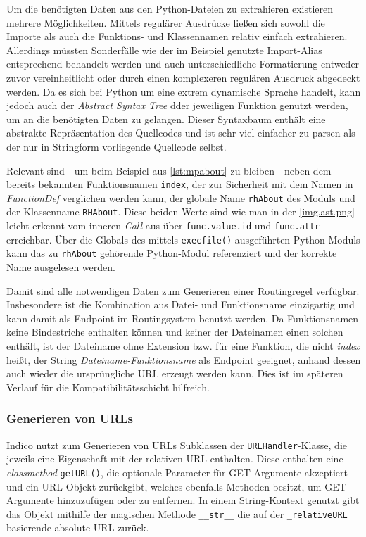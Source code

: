 Um die benötigten Daten aus den Python-Dateien zu extrahieren existieren mehrere Möglichkeiten.
Mittels regulärer Ausdrücke ließen sich sowohl die Importe als auch die Funktions- und Klassennamen
relativ einfach extrahieren. Allerdings müssten Sonderfälle wie der im Beispiel genutzte
Import-Alias entsprechend behandelt werden und auch unterschiedliche Formatierung entweder zuvor
vereinheitlicht oder durch einen komplexeren regulären Ausdruck abgedeckt werden. Da es sich bei
Python um eine extrem dynamische Sprache handelt, kann jedoch auch der \emph{Abstract Syntax Tree}
dder jeweiligen Funktion genutzt werden, um an die benötigten Daten zu gelangen. Dieser Syntaxbaum
enthält eine abstrakte Repräsentation des Quellcodes und ist sehr viel einfacher zu parsen als der
nur in Stringform vorliegende Quellcode selbst.


Relevant sind - um beim Beispiel aus \autoref{lst:mpabout} zu bleiben - neben dem bereits bekannten
Funktionsnamen \lstinline{index}, der zur Sicherheit mit dem Namen in \emph{FunctionDef} verglichen
werden kann, der globale Name \lstinline{rhAbout} des Moduls und der Klassenname
\lstinline{RHAbout}. Diese beiden Werte sind wie man in der \autoref{img.ast.png} leicht erkennt vom
inneren \emph{Call} aus über \lstinline{func.value.id} und \lstinline{func.attr} erreichbar. Über
die Globals des mittels \lstinline{execfile()} ausgeführten Python-Moduls kann das zu
\lstinline{rhAbout} gehörende Python-Modul referenziert und der korrekte Name ausgelesen werden.

Damit sind alle notwendigen Daten zum Generieren einer Routingregel verfügbar. Insbesondere ist die
Kombination aus Datei- und Funktionsname einzigartig und kann damit als Endpoint im Routingsystem
benutzt werden. Da Funktionsnamen keine Bindestriche enthalten können und keiner der Dateinamen
einen solchen enthält, ist der Dateiname ohne Extension bzw. für eine Funktion, die nicht
\emph{index} heißt, der String \emph{Dateiname-Funktionsname} als Endpoint geeignet, anhand dessen
auch wieder die ursprüngliche URL erzeugt werden kann. Dies ist im späteren Verlauf für die
Kompatibilitätsschicht hilfreich.


\subsubsection{Generieren von URLs}

Indico nutzt zum Generieren von URLs Subklassen der \lstinline{URLHandler}-Klasse, die jeweils eine
Eigenschaft mit der relativen URL enthalten. Diese enthalten eine \emph{classmethod}
\lstinline{getURL()}, die optionale Parameter für GET-Argumente akzeptiert und ein URL-Objekt
zurückgibt, welches ebenfalls Methoden besitzt, um GET-Argumente hinzuzufügen oder zu entfernen.
In einem String-Kontext genutzt gibt das Objekt mithilfe der magischen Methode \lstinline{__str__}
die auf der \lstinline{_relativeURL} basierende absolute URL zurück.

